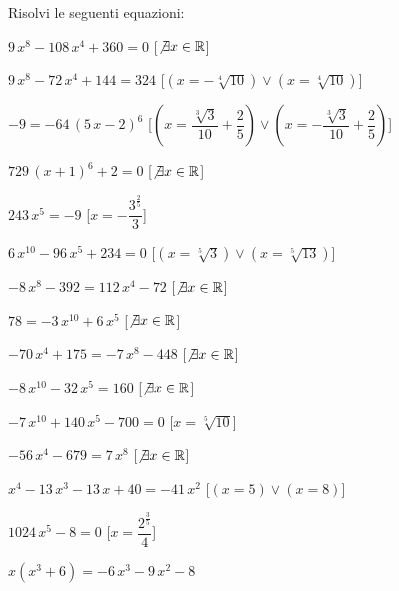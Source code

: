 \begin{esercizio}\label{ese:03.1}
Risolvi le seguenti equazioni:
\begin{enumeratea}
\item $9\,{x}^{8}-108\,{x}^{4}+360=0$ 
\hfill [$\not\exists x \in \mathbb{R}$]
\item $9\,{x}^{8}-72\,{x}^{4}+144=324$ 
\hfill [$(x=-\sqrt [4]{10})\vee (x=\sqrt [4]{10})$]
\item $-9=-64\, \left( 5\,x-2 \right) ^{6}$ 
\hfill [$(x={\dfrac{\sqrt [3]{3}}{10}}+{\dfrac{2}{5}})\vee (x=-{\dfrac
{\sqrt 
[3]{3}}{10}}+{\dfrac{2}{5}})$]
\item $729\, \left( x+1 \right) ^{6}+2=0$ 
\hfill [$\not\exists x \in \mathbb{R}$]
\item $243\,{x}^{5}=-9$ 
\hfill [$x=-{\dfrac{{3}^{{\frac{2}{5}}}}{3}}$]
\item $6\,{x}^{10}-96\,{x}^{5}+234=0$ 
\hfill [$(x=\sqrt [5]{3})\vee (x=\sqrt [5]{13})$]
\item $-8\,{x}^{8}-392=112\,{x}^{4}-72$ 
\hfill [$\not\exists x \in \mathbb{R}$]
\item $78=-3\,{x}^{10}+6\,{x}^{5}$ 
\hfill [$\not\exists x \in \mathbb{R}$]
\item $-70\,{x}^{4}+175=-7\,{x}^{8}-448$ 
\hfill [$\not\exists x \in \mathbb{R}$]
\item $-8\,{x}^{10}-32\,{x}^{5}=160$ 
\hfill [$\not\exists x \in \mathbb{R}$]
\item $-7\,{x}^{10}+140\,{x}^{5}-700=0$ 
\hfill [$x=\sqrt [5]{10}$]
\item $-56\,{x}^{4}-679=7\,{x}^{8}$ 
\hfill [$\not\exists x \in \mathbb{R}$]
\item ${x}^{4}-13\,{x}^{3}-13\,x+40=-41\,{x}^{2}$ 
\hfill [$(x=5)\vee (x=8)$]
\item $1024\,{x}^{5}-8=0$ 
\hfill [$x={\dfrac{{2}^{{\frac{3}{5}}}}{4}}$]
\item $x \left( {x}^{3}+6 \right) =-6\,{x}^{3}-9\,{x}^{2}-8$ 

\end{enumeratea}
\end{esercizio}
